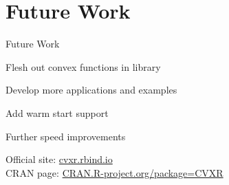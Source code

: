 \documentclass{beamer}
\begin{document}
\section{Future Work}
\begin{frame}{Future Work}
	\BIT
		\item Flesh out convex functions in library
		\item Develop more applications and examples
		\item Add warm start support
		\item Further speed improvements
	\EIT
	
	Official site: \url{cvxr.rbind.io} \\
	CRAN page: \url{CRAN.R-project.org/package=CVXR}
\end{frame}
\end{document}
